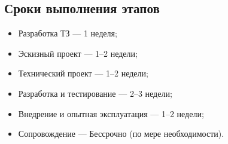 \subsection{Сроки выполнения этапов}

\begin{itemize}
    \item Разработка ТЗ — 1 неделя;
    \item Эскизный проект — 1–2 недели;
    \item Технический проект — 1–2 недели;
    \item Разработка и тестирование — 2–3 недели;
    \item Внедрение и опытная эксплуатация — 1–2 недели;
    \item Сопровождение — Бессрочно (по мере необходимости).
\end{itemize}

